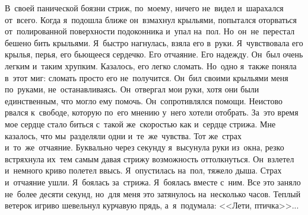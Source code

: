 В~своей панической боязни стриж, по~моему, ничего не~видел и~шарахался от~всего.
Когда я~подошла ближе он~взмахнул крыльями, попытался оторваться от~полированной поверхности подоконника и~упал на~пол.
Но~он~не~перестал бешено бить крыльями.
Я~быстро нагнулась, взяла его в~руки.
Я~чувствовала его крылья, перья, его бьющееся сердечко.
Его отчаяние.
Его надежду.
Он~был очень легким и~таким хрупким.
Казалось, его легко сломать.
Но~одно я~также поняла в~этот миг: сломать просто его не~получится.
Он~бил своими крыльями меня по~руками, не~останавливаясь.
Он~отвергал мои руки, хотя они были единственным, что могло ему помочь.
Он~сопротивлялся помощи.
Неистово рвался к~свободе, которую по~его мнению у~него хотели отобрать.
За~это время мое сердце стало биться с~такой же~скоростью как и~сердце стрижа.
Мне казалось, что мы~разделяли одни и~те~же~чувства.
Тот же~страх и~то~же~отчаяние.
Буквально через секунду я~высунула руки из~окна, резко встряхнула их~тем самым давая стрижу возможность оттолкнуться.
Он~взлетел и~немного криво полетел ввысь.
Я~опустилась на~пол, тяжело дыша.
Страх и~отчаяние ушли.
Я~боялась за~стрижа.
Я~боялась вместе с~ним.
Все это заняло не~более десяти секунд, но~для меня это затянулось на~несколько часов.
Теплый ветерок игриво шевельнул курчавую прядь, а~я~подумала: <<Лети, птичка>>...

